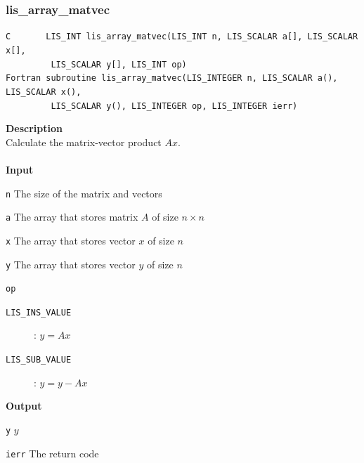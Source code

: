 \documentclass[a4paper]{article}
\newcommand{\namelistlabel}[1]{\mbox{#1}\hfill}
\newenvironment{namelist}[1]{%
\begin{list}{}
  {\let\makelabel\namelistlabel
  \settowidth{\labelwidth}{#1}
  \setlength{\leftmargin}{1.1\labelwidth}}
  }{%
\end{list}}
\begin{document}
\newpage
\subsubsection{lis\_array\_matvec}
\begin{screen}
\verb|C       LIS_INT lis_array_matvec(LIS_INT n, LIS_SCALAR a[], LIS_SCALAR x[],|\\
\verb|         LIS_SCALAR y[], LIS_INT op)|\\
\verb|Fortran subroutine lis_array_matvec(LIS_INTEGER n, LIS_SCALAR a(), LIS_SCALAR x(),|\\
\verb|         LIS_SCALAR y(), LIS_INTEGER op, LIS_INTEGER ierr)|
\end{screen}
{\bf Description}\\
\indent
Calculate the matrix-vector product $Ax$.
\\ \\
\noindent
{\bf Input}
\begin{namelist}{XXXXXXXXXXXXXXXXXXXX}
\item[\tt n] The size of the matrix and vectors  
\item[\tt a] The array that stores matrix $A$ of size $n \times n$
\item[\tt x] The array that stores vector $x$ of size $n$
\item[\tt y] The array that stores vector $y$ of size $n$
\item[\tt op] \begin{description}
\item[\tt LIS\_INS\_VALUE]: $y = Ax$
\item[\tt LIS\_SUB\_VALUE]: $y = y - Ax$
\end{description}
\end{namelist}
{\bf Output}
\begin{namelist}{XXXXXXXXXXXXXXXXXXXX}
\item[\tt y] $y$
\item[\tt ierr] The return code
\end{namelist}
\end{document}
